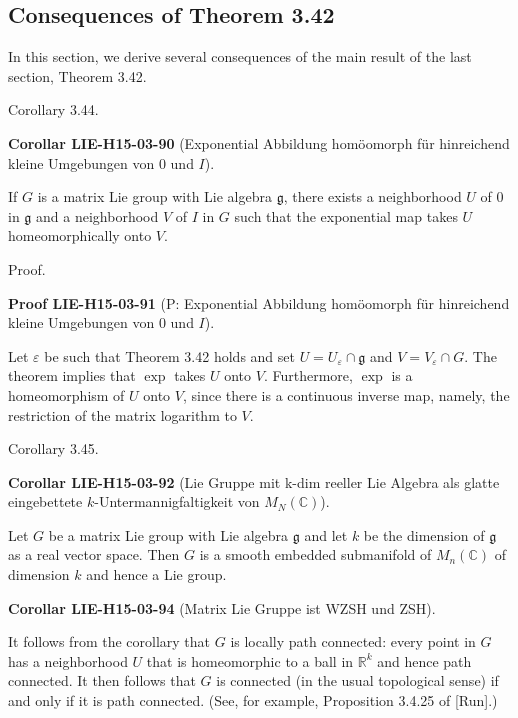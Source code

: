 \documentclass[10pt, letterpaper]{article}
\newcommand{\C}{\mathbb{C}}
\newcommand{\CustomHeading}[3]{%
  \par\medskip\noindent%
  \textbf{#1 #2} \textnormal{(#3)}.\enskip%
}
\newenvironment{KORO}[2]{\begin{unitbox}\CustomHeading{Corollar}{#1}{#2}}{\end{unitbox}}
\newenvironment{PROOF}[2]{\begin{unitbox}\CustomHeading{Proof}{#1}{#2}}{\end{unitbox}}
\begin{document}
\subsection*{Consequences of Theorem 3.42}



In this section, we derive several consequences of the main result of the last section, Theorem 3.42.

Corollary 3.44. 

\begin{KORO}{LIE-H15-03-90}{Exponential Abbildung homöomorph für hinreichend kleine Umgebungen von $0$ und $I$}
If $G$ is a matrix Lie group with Lie algebra $\mathfrak{g}$, there exists a neighborhood $U$ of 0 in $\mathfrak{g}$ and a neighborhood $V$ of $I$ in $G$ such that the exponential map takes $U$ homeomorphically onto $V$.
\end{KORO}

Proof. 

\begin{PROOF}{LIE-H15-03-91}{P: Exponential Abbildung homöomorph für hinreichend kleine Umgebungen von $0$ und $I$}
Let $\varepsilon$ be such that Theorem 3.42 holds and set $U=U_{\varepsilon} \cap \mathfrak{g}$ and $V= V_{\varepsilon} \cap G$. The theorem implies that $\exp$ takes $U$ onto $V$. Furthermore, $\exp$ is a homeomorphism of $U$ onto $V$, since there is a continuous inverse map, namely, the restriction of the matrix logarithm to $V$.
\end{PROOF}

Corollary 3.45. 


\begin{KORO}{LIE-H15-03-92}{Lie Gruppe mit k-dim reeller Lie Algebra als glatte eingebettete $k$-Untermannigfaltigkeit von $M_N(\C)$}
Let $G$ be a matrix Lie group with Lie algebra $\mathfrak{g}$ and let $k$ be the dimension of $\mathfrak{g}$ as a real vector space. Then $G$ is a smooth embedded submanifold of $M_{n}(\mathbb{C})$ of dimension $k$ and hence a Lie group.
\end{KORO}

\begin{KORO}{LIE-H15-03-94}{Matrix Lie Gruppe ist WZSH und ZSH}
It follows from the corollary that $G$ is locally path connected: every point in $G$ has a neighborhood $U$ that is homeomorphic to a ball in $\mathbb{R}^{k}$ and hence path connected. It then follows that $G$ is connected (in the usual topological sense) if and only if it is path connected. (See, for example, Proposition 3.4.25 of [Run].)
\end{KORO}
\end{document}
